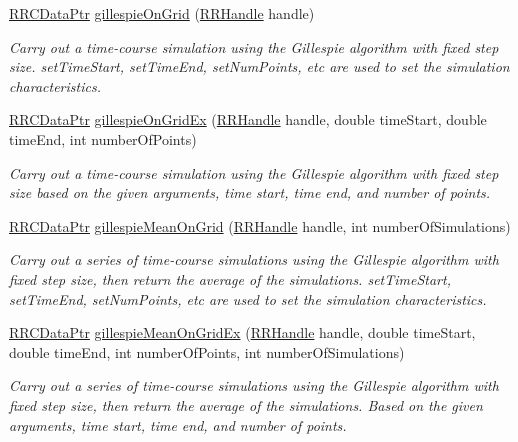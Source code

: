 \begin{DoxyCompactItemize}
\hyperlink{rrc__types_8h_a9da8b124eb9c3c0045f8926c6a420b4a}{R\+R\+C\+Data\+Ptr} \hyperlink{group__stochastic_gad0b691715fdddc67fa25c4478a7fe6b8}{gillespie\+On\+Grid} (\hyperlink{rrc__types_8h_a1d68f0592372208fa5a5f2799ea4b3ae}{R\+R\+Handle} handle)
\begin{DoxyCompactList}\small\item\em Carry out a time-\/course simulation using the Gillespie algorithm with fixed step size. set\+Time\+Start, set\+Time\+End, set\+Num\+Points, etc are used to set the simulation characteristics. \end{DoxyCompactList}\item 
\hyperlink{rrc__types_8h_a9da8b124eb9c3c0045f8926c6a420b4a}{R\+R\+C\+Data\+Ptr} \hyperlink{group__stochastic_gae6789000f5ea8712c594150b27ce8d87}{gillespie\+On\+Grid\+Ex} (\hyperlink{rrc__types_8h_a1d68f0592372208fa5a5f2799ea4b3ae}{R\+R\+Handle} handle, double time\+Start, double time\+End, int number\+Of\+Points)
\begin{DoxyCompactList}\small\item\em Carry out a time-\/course simulation using the Gillespie algorithm with fixed step size based on the given arguments, time start, time end, and number of points. \end{DoxyCompactList}\item 
\hyperlink{rrc__types_8h_a9da8b124eb9c3c0045f8926c6a420b4a}{R\+R\+C\+Data\+Ptr} \hyperlink{group__stochastic_ga46197b22a2cacfa3bdae630273d91dac}{gillespie\+Mean\+On\+Grid} (\hyperlink{rrc__types_8h_a1d68f0592372208fa5a5f2799ea4b3ae}{R\+R\+Handle} handle, int number\+Of\+Simulations)
\begin{DoxyCompactList}\small\item\em Carry out a series of time-\/course simulations using the Gillespie algorithm with fixed step size, then return the average of the simulations. set\+Time\+Start, set\+Time\+End, set\+Num\+Points, etc are used to set the simulation characteristics. \end{DoxyCompactList}\item 
\hyperlink{rrc__types_8h_a9da8b124eb9c3c0045f8926c6a420b4a}{R\+R\+C\+Data\+Ptr} \hyperlink{group__stochastic_ga36f575b021017cbcac1e14ca839e5944}{gillespie\+Mean\+On\+Grid\+Ex} (\hyperlink{rrc__types_8h_a1d68f0592372208fa5a5f2799ea4b3ae}{R\+R\+Handle} handle, double time\+Start, double time\+End, int number\+Of\+Points, int number\+Of\+Simulations)
\begin{DoxyCompactList}\small\item\em Carry out a series of time-\/course simulations using the Gillespie algorithm with fixed step size, then return the average of the simulations. Based on the given arguments, time start, time end, and number of points. \end{DoxyCompactList}\item 

\end{DoxyCompactItemize}
